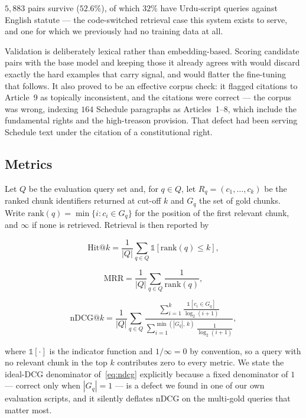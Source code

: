 \documentclass[conference]{IEEEtran}
\begin{document}
$5{,}883$ pairs survive ($52.6\%$), of which $32\%$ have Urdu-script queries
against English statute --- the code-switched retrieval case this system exists
to serve, and one for which we previously had no training data at all.

Validation is deliberately lexical rather than embedding-based. Scoring
candidate pairs with the base model and keeping those it already agrees with
would discard exactly the hard examples that carry signal, and would flatter the
fine-tuning that follows. It also proved to be an effective corpus check: it
flagged citations to Article~9 as topically inconsistent, and the citations were
correct --- the corpus was wrong, indexing $164$ Schedule paragraphs as
Articles~1--8, which include the fundamental rights and the high-treason
provision. That defect had been serving Schedule text under the citation of a
constitutional right.

\subsection{Metrics}
Let $Q$ be the evaluation query set and, for $q \in Q$,
let $R_q = (c_1,\dots,c_k)$ be the ranked chunk identifiers returned at cut-off
$k$ and $G_q$ the set of gold chunks. Write $\mathrm{rank}(q) = \min\{i : c_i \in G_q\}$
for the position of the first relevant chunk, and $\infty$ if none is retrieved.
Retrieval is then reported by

\begin{equation}
\mathrm{Hit}@k = \frac{1}{|Q|}\sum_{q \in Q}
  \mathbb{1}\!\left[\mathrm{rank}(q) \le k\right],
\label{eq:hit}
\end{equation}

\begin{equation}
\mathrm{MRR} = \frac{1}{|Q|}\sum_{q \in Q} \frac{1}{\mathrm{rank}(q)},
\label{eq:mrr}
\end{equation}

\begin{equation}
\mathrm{nDCG}@k = \frac{1}{|Q|}\sum_{q \in Q}
  \frac{\displaystyle\sum_{i=1}^{k}
        \frac{\mathbb{1}\!\left[c_i \in G_q\right]}{\log_2 (i+1)}}
       {\displaystyle\sum_{i=1}^{\min(|G_q|,\,k)} \frac{1}{\log_2 (i+1)}},
\label{eq:ndcg}
\end{equation}

\noindent where $\mathbb{1}[\cdot]$ is the indicator function and $1/\infty = 0$
by convention, so a query with no relevant chunk in the top $k$ contributes zero
to every metric. We state the ideal-DCG denominator of~\eqref{eq:ndcg}
explicitly because a fixed denominator of $1$ --- correct only when $|G_q| = 1$
--- is a defect we found in one of our own evaluation scripts, and it silently
deflates nDCG on the multi-gold queries that matter most.
\end{document}
